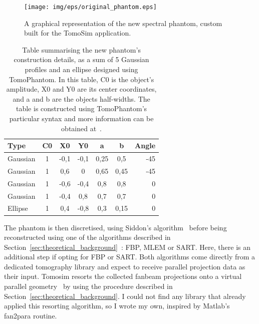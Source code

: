 \begin{figure}[htpb]
    \centering
    \texttt{[image: img/eps/original\_phantom.eps]}
    \caption{A graphical representation of the new spectral phantom,
    custom built for the TomoSim application.}
    \label{fig:new_phantom}
\end{figure}


\begin{table}[htpb]
    \centering
    \caption{Table summarising the new phantom's construction details,
    as a sum of 5 Gaussian profiles and an ellipse designed using
    TomoPhantom. In this table, C0 is the object's amplitude, X0 and Y0
    are its center coordinates, and a and b are the objects half-widths.
    The table is constructed using TomoPhantom's particular syntax and
    more information can be obtained at~\cite{Kazantsev2018}.}
    \label{tab:new_phantom}
    \begin{tabular}{@{}lcccccr@{}}
    \hline
    \textbf{Type} & \textbf{C0} & \textbf{X0} & \textbf{Y0} & \textbf{a}
                  & \textbf{b} & \textbf{\textbf{Angle}} \\ \hline
    Gaussian & 1 & -0,1 & -0,1 & 0,25 & 0,5 & -45 \\
    Gaussian & 1 & 0,6 & 0 & 0,65 & 0,45 & -45 \\
    Gaussian & 1 & -0,6 & -0,4 & 0,8 & 0,8 & 0 \\
    Gaussian & 1 & -0,4 & 0,8 & 0,7 & 0,7 & 0 \\
    Ellipse & 1 & 0,4 & -0,8 & 0,3 & 0,15 & 0 \\ \hline
    \end{tabular}
\end{table}

The phantom is then discretised, using Siddon's algorithm~ before being reconstructed using one of the algorithms described
in Section~\ref{sec:theoretical_background}~:
\gls{FBP}, \gls{MLEM} or \gls{SART}. Here, there is an additional step
if opting for \gls{FBP} or \gls{SART}. Both algorithms come directly
from a dedicated tomography library and expect to receive parallel
projection data as their input. Tomosim resorts the collected fanbeam
projections onto a virtual parallel geometry~ by
using the procedure described in
Section~\ref{sec:theoretical_background}. I could not find any library
that already applied this resorting algorithm, so I wrote my own,
inspired by Matlab's fan2para routine. 

